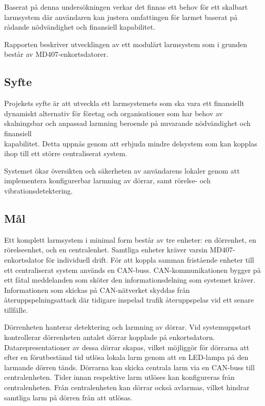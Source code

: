 \documentclass{article}
\begin{document}
Baserat på denna undersökningen verkar det finnas ett behov för ett skalbart larmsystem där användaren kan justera omfattingen för larmet baserat på rådande nödvändighet och finansiell kapabilitet.

Rapporten beskriver utvecklingen av ett modulärt larmsystem som i grunden består av MD407-enkortsdatorer.

\subsection{Syfte} %
Projekets syfte är att utveckla ett larmsystemets som ska vara ett finansiellt dynamiskt alternativ för företag
och organisationer som har behov av skalningsbar och anpassad larmning beroende på nuvarande nödvändighet och finansiell \\ kapabilitet.
Detta uppnås genom att erbjuda mindre delsystem som kan kopplas ihop till ett större centraliserat system.

Systemet ökar översikten och säkerheten av användarens lokaler genom att implementera konfigurerbar larmning av dörrar, samt rörelse- och vibrationsdetektering.

\subsection{Mål} %
Ett komplett larmsystem i minimal form består av tre enheter: en dörrenhet, en rörelseenhet, och en centralenhet.
Samtliga enheter kräver varsin MD407-enkortsdator för individuell drift. För att koppla samman
fristående enheter till ett centraliserat system används en CAN-buss.
CAN-kommunikationen bygger på ett fåtal meddelanden som sköter den informationsdelning som systemet kräver. Informationen som skickas på CAN-nätverket skyddas från återuppspelningsattack där tidigare inspelad trafik återuppspelas vid ett senare tillfälle.

Dörrenheten hanterar detektering och larmning av dörrar. Vid systemuppstart kontrollerar
dörrenheten antalet dörrar kopplade på enkortsdatorn. Datarepresentationer av dessa dörrar skapas, vilket möjliggör för dörrarna att efter en förutbestämd tid utlösa lokala larm genom att en LED-lampa på den larmande dörren tänds.
Dörrarna kan skicka centrala larm via en CAN-buss till centralenheten. Tider innan respektive larm utlöses kan konfigureras från centralenheten.
Från centralenheten kan dörrar också avlarmas, vilket hindrar samtliga larm på dörren från att utlösas.
\end{document}
